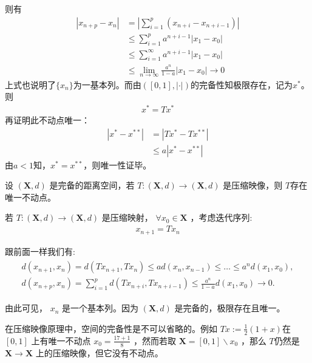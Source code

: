 则有
\begin{align}
    |x_{n+p} - x_n| &= |\sum\limits_{i=1}^p (x_{n+i} - x_{n+i-1})| \nonumber\\
    & \leqslant \sum\limits_{i=1}^p a^{n+i-1}|x_1-x_0| \nonumber \\
    & \leqslant \sum\limits_{i=1}^{\infty} a^{n+i-1} |x_1 - x_0| \nonumber \\
    & \leqslant\lim\limits_{n\to\infty} \frac{a^n}{1-a}|x_1 - x_0| \to 0
\end{align}
上式也说明了$\{x_n\}$为一基本列。而由$([0, 1], |\cdot|)$的完备性知极限存在，记为$x^*$。则
\begin{align*}
    x^* = Tx^*
\end{align*}
再证明此不动点唯一：
\begin{align*}
    |x^* - x^{**}| &= |Tx^* - Tx^{**}|\\
    & \leqslant a|x^* - x^{**}|
\end{align*}
由$a<1$知，$x^{*} = x^{**}$，则唯一性证毕。
\begin{theorem}
    设 $(\mathbf{X}, d)$ 是完备的距离空间，若 $T:(\mathbf{X}, d) \rightarrow(\mathbf{X}, d)$ 是压缩映像，则 $T$存在唯一不动点。
\end{theorem}
\begin{solution}
    若 $T:(\mathbf{X}, d) \rightarrow(\mathbf{X}, d)$ 是压缩映射， $\forall x_0 \in \mathbf{X}$ ，考虑迭代序列:
    \begin{align*}
        x_{n+1}=T x_n
    \end{align*}

    跟前面一样我们有:
    \begin{align*}
        \begin{gathered}
            d\left(x_{n+1}, x_n\right)=d\left(T x_{n+1}, T x_n\right) \leq a d\left(x_n, x_{n-1}\right) \leq \ldots \leq a^n d\left(x_1, x_0\right), \\
            d\left(x_{n+p}, x_n\right)=\sum_{i=1}^p d\left(T x_{n+i}, T x_{n+i-1}\right) \leq \frac{a^n}{1-a} d\left(x_1, x_0\right) \rightarrow 0 .
        \end{gathered}
    \end{align*}

    由此可见， $x_n$ 是一个基本列。因为 $(\mathbf{X}, d)$ 是完备的，极限存在且唯一。
    
    在压缩映像原理中，空间的完备性是不可以省略的。例如 $T x:=\frac{1}{2}(1+x)$在 $[0,1]$ 上有唯一不动点 $x_0=\frac{17+1}{8}$ ，然而若取 $\mathbf{X}=[0,1] \backslash x_0$ ，那么 $T$仍然是 $\mathbf{X} \rightarrow \mathbf{X}$ 上的压缩映像，但它没有不动点。
\end{solution}

